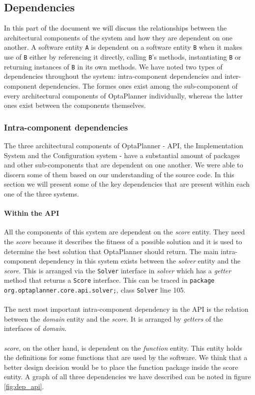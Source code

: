 \subsection{Dependencies}
In this part of the document we will discuss the relationships between the architectural components of the system and how they are dependent on one another. A software entity \verb!A! is dependent on a software entity \verb!B! when it makes use of \verb!B! either by referencing it directly, calling \verb!B!'s methods, instantiating \verb!B! or returning instances of \verb!B! in its own methods. We have noted two types of dependencies throughout the system: intra-component dependencies and inter-component dependencies. The formes ones exist among the sub-component of every architectural components of OptaPlanner individually, whereas the latter ones exist between the components themselves. 
\subsubsection{Intra-component dependencies}
The three architectural components of OptaPlanner - API, the Implementation System and the Configuration system - have a substantial amount of packages and other sub-components that are dependent on one another. We were able to discern some of them based on our understanding of the source code. In this section we will present some of the key dependencies that are present within each one of the three systems.
\paragraph{Within the API}
All the components of this system are dependent on the \textit{score} entity. They need the \textit{score} because it describes the fitness of a possible solution and it is used to determine the best solution that OptaPlanner should return. The main intra-component dependency in this system exists between the \textit{solver} entity and the \textit{score}. This is arranged via the \verb!Solver! interface in \textit{solver} which has a \textit{getter} method that returns a \verb!Score! interface. This can be traced in \verb!package org.optaplanner.core.api.solver;!, class \verb!Solver! line 105. \\\\
The next most important intra-component dependency in the API is the relation between the \textit{domain} entity and the \textit{score}. It is arranged by \textit{getters} of the interfaces of \textit{domain}.\\\\
\textit{score}, on the other hand, is dependent on the \textit{function} entity. This entity holds the definitions for some functions that are used by the software. We think that a better design decision would be to place the function package inside the score entity.
A graph of all three dependencies we have described can be noted in figure \ref{fig:dep_api}.
